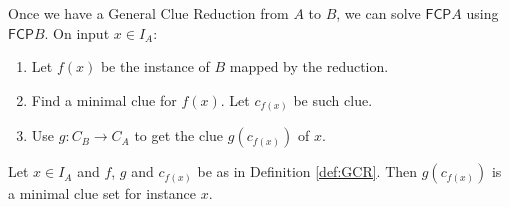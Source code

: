 \documentclass[runningheads,a4paper]{llncs}
\begin{document}
Once we have a General Clue Reduction from $A$ to $B$, we can solve $\mathsf{FCP} A$ using $\mathsf{FCP} B$. On input $x \in I_A$:
\begin{enumerate}
\item Let $f(x)$ be the instance of $B$ mapped by the reduction.
\item Find a minimal clue for $f(x)$. Let $c_{f(x)}$ be such clue. 
\item Use $g: C_B \rightarrow C_A$ to get the clue $g(c_{f(x)})$ of $x$.
\end{enumerate}

\begin{lemma}\label{lemmaMinClue}
Let $x \in I_A$ and $f$, $g$ and $c_{f(x)}$ be as in Definition \ref{def:GCR}. Then $g(c_{f(x)})$ is a minimal clue set for instance $x$.
\end{lemma}
\end{document}
